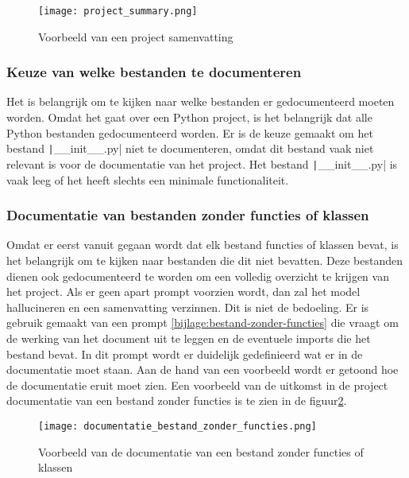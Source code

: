 \begin{figure}[h]
    \centering
    \texttt{[image: project\_summary.png]}
    \caption{Voorbeeld van een project samenvatting}
    \label{fig:project-summary}
\end{figure}    

\subsubsection{Keuze van welke bestanden te documenteren}
\label{subsec:project-documentatie-keuze-bestanden}

Het is belangrijk om te kijken naar welke bestanden er gedocumenteerd moeten worden.
Omdat het gaat over een Python project, is het belangrijk dat alle Python bestanden gedocumenteerd worden.
Er is de keuze gemaakt om het bestand \texttt|__init__.py| niet te documenteren, omdat dit bestand vaak niet relevant is voor de documentatie van het project.
Het bestand \texttt|__init__.py| is vaak leeg of het heeft slechts een minimale functionaliteit. 

\subsubsection{Documentatie van bestanden zonder functies of klassen}
\label{subsec:project-documentatie-geen-functies}

Omdat er eerst vanuit gegaan wordt dat elk bestand functies of klassen bevat, is het belangrijk om te kijken naar bestanden die dit niet bevatten.
Deze bestanden dienen ook gedocumenteerd te worden om een volledig overzicht te krijgen van het project.
Als er geen apart prompt voorzien wordt, dan zal het model hallucineren en een samenvatting verzinnen. Dit is niet de bedoeling.
Er is gebruik gemaakt van een prompt \ref{bijlage:bestand-zonder-functies} die vraagt om de werking van het document uit te leggen en de eventuele imports die het bestand bevat.
In dit prompt wordt er duidelijk gedefinieerd wat er in de documentatie moet staan. 
Aan de hand van een voorbeeld wordt er getoond hoe de documentatie eruit moet zien.
Een voorbeeld van de uitkomst in de project documentatie van een bestand zonder functies is te zien in de figuur\ref{fig:file-no-functions}.

\begin{figure}[h]
    \centering
    \texttt{[image: documentatie\_bestand\_zonder\_functies.png]}
    \caption{Voorbeeld van de documentatie van een bestand zonder functies of klassen}
    \label{fig:file-no-functions}
\end{figure}

